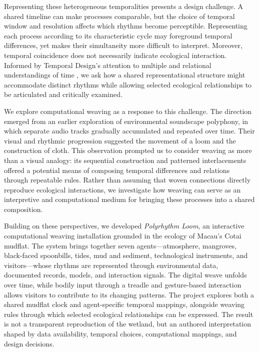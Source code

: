 \documentclass[manuscript,review,anonymous]{acmart}
\begin{document}
Representing these heterogeneous temporalities presents a design challenge. A shared timeline can make processes comparable, but the choice of temporal window and resolution affects which rhythms become perceptible. Representing each process according to its characteristic cycle may foreground temporal differences, yet makes their simultaneity more difficult to interpret. Moreover, temporal coincidence does not necessarily indicate ecological interaction. Informed by Temporal Design's attention to multiple and relational understandings of time \cite{pschetz2018}, we ask how a shared representational structure might accommodate distinct rhythms while allowing selected ecological relationships to be articulated and critically examined.

We explore computational weaving as a response to this challenge. The direction emerged from an earlier exploration of environmental soundscape polyphony, in which separate audio tracks gradually accumulated and repeated over time. Their visual and rhythmic progression suggested the movement of a loom and the construction of cloth. This observation prompted us to consider weaving as more than a visual analogy: its sequential construction and patterned interlacements offered a potential means of composing temporal differences and relations through repeatable rules. Rather than assuming that woven connections directly reproduce ecological interactions, we investigate how weaving can serve as an interpretive and computational medium for bringing these processes into a shared composition.

Building on these perspectives, we developed \emph{Polyrhythm Loom}, an interactive computational weaving installation grounded in the ecology of Macau's Cotai mudflat. The system brings together seven agents—atmosphere, mangroves, black-faced spoonbills, tides, mud and sediment, technological instruments, and visitors—whose rhythms are represented through environmental data, documented records, models, and interaction signals. The digital weave unfolds over time, while bodily input through a treadle and gesture-based interaction allows visitors to contribute to its changing patterns. The project explores both a shared mudflat clock and agent-specific temporal mappings, alongside weaving rules through which selected ecological relationships can be expressed. The result is not a transparent reproduction of the wetland, but an authored interpretation shaped by data availability, temporal choices, computational mappings, and design decisions.
\end{document}
